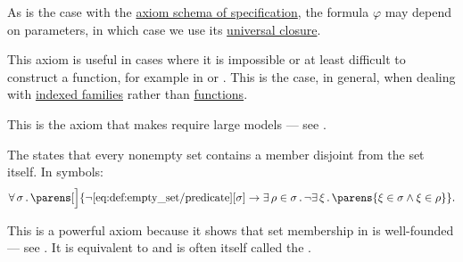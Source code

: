 \begin{definition}
\begin{thmenum}
    As is the case with the \hyperref[def:zfc/specification]{axiom schema of specification}, the formula \( \varphi \) may depend on parameters, in which case we use its \hyperref[def:universal_closure]{universal closure}.

    This axiom is useful in cases where it is impossible or at least difficult to construct a function, for example in  or . This is the case, in general, when dealing with \hyperref[thm:zfc_existence_theorems/indexed_family]{indexed families} rather than \hyperref[def:function]{functions}.

    This is the axiom that makes  require large models --- see .

     The  states that every nonempty set contains a member disjoint from the set itself. In symbols:
    \begin{equation}\label{eq:def:zfc/foundation}
      \qforall \sigma \parens[\Big]
        {
          \neg \ref{eq:def:empty_set/predicate}[\sigma]
          \rightarrow
          \qexists {\rho \in \sigma} \neg \qexists \xi \parens{ \xi \in \sigma \wedge \xi \in \rho }
        }.
    \end{equation}

    This is a powerful axiom because it shows that set membership in  is well-founded --- see . It is equivalent to  and is often itself called the .
  \end{thmenum}
\end{definition}

